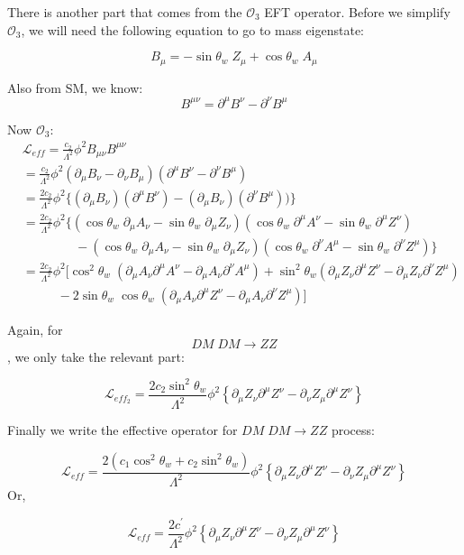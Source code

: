 \documentclass[12pt]{report}
\begin{document}
There is another part that comes from the $\mathcal{O}_3$ EFT operator. Before we simplify $\mathcal{O}_3$, we will need the following equation to go to mass eigenstate:

$$B_\mu= -\sin\theta_w\; Z_\mu +\cos\theta_w\; A_\mu $$


Also from SM, we know:
$$B^{\mu \nu} = \partial^\mu B^\nu - \partial^\nu B^\mu$$

Now $\mathcal{O}_3$:
\begin{align*}
&\mathscr{L}_{eff}=\frac{c_2}{\Lambda^2} \phi^2 B_{\mu \nu} B^{\mu \nu}\\
& = \frac{c_2}{\Lambda^2} \phi^2 (\partial_\mu B_\nu - \partial_\nu B_\mu)(\partial^\mu B^\nu - \partial^\nu B^\mu)\\
&=\frac{2c_2}{\Lambda^2} \phi^2 \{ (\partial_\mu B_\nu)( \partial^\mu B^\nu)- (\partial_\mu B_\nu)( \partial^\nu B^\mu) )\}\\
&= \frac{2c_2}{\Lambda^2} \phi^2 \{(\cos\theta_w\; \partial_\mu A_\nu - \sin\theta_w \; \partial_\mu Z_\nu)(\cos\theta_w \; \partial^\mu A^\nu- \sin\theta_w \; \partial^\mu Z^\nu)\\
&\; \; \; \; \;\; \; \; \; \;\; \; \; \; \; -(\cos\theta_w \; \partial_\mu A_\nu -\sin\theta_w \; \partial_\mu Z_\nu)(\cos\theta_w \; \partial^\nu A^\mu - \sin\theta_w \; \partial^\nu Z^\mu) \}\\
&= \frac{2c_2}{\Lambda^2} \phi^2 [\cos^2\theta_w \; (\partial_\mu A_\nu \partial^\mu A^\nu-\partial_\mu A_\nu \partial^\nu A^\mu)+\sin^2\theta_w(\partial_\mu Z_\nu \partial^\mu Z^\nu - \partial_\mu Z_\nu \partial^\nu Z^\mu)\\
&\;\;\;\;\;\;\;\;\;\; -2 \sin\theta_w \; \cos\theta_w \; (\partial_\mu A_\nu \partial^\mu Z^\nu-\partial_\mu A_\nu \partial^\nu Z^\mu)]
\end{align*}

Again, for $$DM \; DM \longrightarrow ZZ$$, we only take the relevant part:

$$\mathscr{L}_{eff_2}=\frac{2c_2\sin^2\theta_w}{\Lambda^2} \phi^2 \left\{\partial_\mu Z_\nu \partial^\mu Z^\nu - \partial_\nu Z_\mu  \partial^\mu Z^\nu \right\}$$

Finally we write the effective operator for $DM \; DM \longrightarrow ZZ$ process:

$$\mathscr{L}_{eff}=\frac{2(c_1\cos^2\theta_w+c_2\sin^2\theta_w)}{\Lambda^2} \phi^2 \left\{\partial_\mu Z_\nu \partial^\mu Z^\nu - \partial_\nu Z_\mu  \partial^\mu Z^\nu \right\}$$
Or,

\begin{equation}
\mathscr{L}_{eff}=\frac{2c^\prime}{\Lambda^2} \phi^2 \left\{\partial_\mu Z_\nu \partial^\mu Z^\nu - \partial_\nu Z_\mu  \partial^\mu Z^\nu \right\}
\end{equation}
\end{document}
